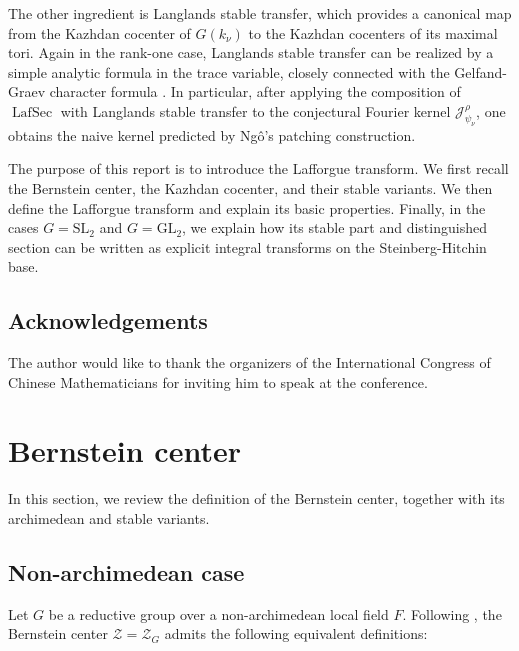 \documentclass[iccmp]{ipbook}
\newcommand{\CJ}{{\mathcal {J}}}
\newcommand{\CZ}{{\mathcal {Z}}}
\newcommand{\GL}{{\mathrm{GL}}}
\newcommand{\SL}{{\mathrm{SL}}}
\newcommand{\LafSec}{\operatorname{LafSec}}
\begin{document}
The other ingredient is Langlands stable transfer, which provides a canonical map from the Kazhdan cocenter of $G(k_\nu)$ to the Kazhdan cocenters of its maximal tori.
Again in the rank-one case,
Langlands stable transfer can be realized by a simple analytic formula in the trace variable, closely connected with the Gelfand-Graev character formula \cite{MR0155931}. In particular, after
applying the composition of $\LafSec$ with Langlands stable transfer to the conjectural Fourier kernel $\CJ^{\rho}_{\psi_\nu}$,
one obtains the naive kernel predicted by Ng\^o's patching construction.

The purpose of this report is to introduce the Lafforgue transform. We first recall the Bernstein center, the Kazhdan cocenter, and their stable variants. We then define the Lafforgue transform and explain its basic properties. Finally, in the cases $G=\SL_2$ and $G=\GL_2$, we explain how its stable part and distinguished section can be written as explicit integral transforms on the Steinberg-Hitchin base.

\subsection*{Acknowledgements}

The author would like to thank the organizers of the International
Congress of Chinese Mathematicians for inviting him to speak at the conference.



\section{Bernstein center}\label{sec:BC}



In this section, we review the definition of the Bernstein center, together with its
archimedean and stable variants.


\subsection{Non-archimedean case}\label{subsec:non-archi:BC}

Let $G$ be a reductive group over a non-archimedean local field $F$. Following \cite{BD84}, the Bernstein center $\CZ=\CZ_G$ admits the following equivalent definitions:
\end{document}
